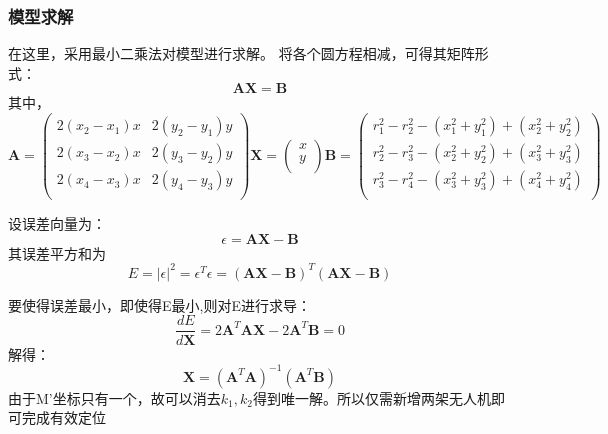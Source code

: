 \documentclass{cumcmthesis}
\begin{document}
\subsubsection{模型求解}
在这里，采用最小二乘法对模型进行求解。
将各个圆方程相减，可得其矩阵形式：
\begin{equation}
	\mathbf{AX}=\mathbf{B}
	\label{eq:20}
\end{equation}
其中，
\[
\mathbf{A} = \left(
\begin{array}{cc}
	2(x_2-x_1)x & 2(y_2-y_1)y \\
	2(x_3-x_2)x & 2(y_3-y_2)y \\
	2(x_4-x_3)x & 2(y_4-y_3)y\\
\end{array} \right)
\mathbf{X} = \left(
\begin{array}{c}
	x   \\
	y  \\
\end{array} \right)
\mathbf{B} = \left(
\begin{array}{cc}
	r_1^2-r_2^2 -(x_1^2+y_1^2)+(x_2^2+y_2^2)   \\
	r_2^2-r_3^2 -(x_2^2+y_2^2)+(x_3^2+y_3^2)   \\
	r_3^2-r_4^2 -(x_3^2+y_3^2)+(x_4^2+y_4^2)  \\
\end{array} \right)
\]

设误差向量为：\[\epsilon=\mathbf{AX}-\mathbf{B}\]其误差平方和为\[E=|\epsilon|^2=\epsilon^T \epsilon=(\mathbf{AX}-\mathbf{B})^T(\mathbf{AX}-\mathbf{B}) \]

要使得误差最小，即使得E最小,则对E进行求导：
\[\frac{dE}{d\mathbf{X}}=2\mathbf{A}^T\mathbf{A}\mathbf{X}-2\mathbf{A}^T\mathbf{B}=0\]
解得：
\begin{equation}
	\mathbf{X}=(\mathbf{A}^T\mathbf{A})^{-1}(\mathbf{A}^T\mathbf{B})
	\label{eq:21}
\end{equation}
由于M'坐标只有一个，故可以消去$k_1,k_2$得到唯一解。所以仅需新增两架无人机即可完成有效定位
\end{document}
